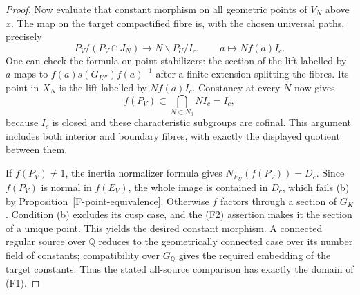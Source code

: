 \documentclass[11pt,oneside]{article}
\begin{document}
\begin{proof}
Now evaluate that constant morphism on all geometric points
of $V_N$ above $x$. The map on the target compactified fibre
is, with the chosen universal paths, precisely
\[
 P_V/(P_V\cap J_N)\longrightarrow N\backslash P_U/I_c,
       \qquad a\longmapsto N f(a)I_c.
\]
One can check the formula on point stabilizers: the section
of the lift labelled by $a$ maps to
$f(a)s(G_{K''})f(a)^{-1}$ after a finite extension splitting
the fibres. Its point in $X_N$ is the lift labelled by
$Nf(a)I_c$. Constancy at every $N$ now gives
\[
 f(P_V)\subset\bigcap_{N\subset N_0}N I_c=I_c,
\]
because $I_c$ is closed and these characteristic subgroups
are cofinal. This argument includes both interior and boundary
fibres, with exactly the displayed quotient between them.

If $f(P_V)\ne1$, the inertia normalizer formula gives
$N_{E_U}(f(P_V))=D_c$. Since $f(P_V)$ is normal in $f(E_V)$,
the whole image is contained in $D_c$, which fails (b) by
Proposition~\ref{F-point-equivalence}. Otherwise $f$ factors
through a section of $G_K$. Condition (b) excludes its cusp
case, and the (F2) assertion makes it the section of a unique
point. This yields the desired constant morphism. A connected
regular source over $\mathbb Q$ reduces to the geometrically
connected case over its number field of constants; compatibility
over $G_{\mathbb Q}$ gives the required embedding of the
target constants. Thus the stated all-source comparison has
exactly the domain of (F1).
\end{proof}
\end{document}
